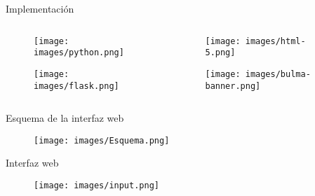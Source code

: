 \documentclass[8pt,xcolor=dvipsnames]{beamer}
\begin{document}
\begin{frame}[fragile]{Implementación}
    \begin{columns}
        \begin{column}{0.45\textwidth}
            \begin{figure}
                \centering
                \texttt{[image: images/python.png]}
            \end{figure}
            \vspace{1.5cm}
            \begin{figure}
                \centering
                \texttt{[image: images/flask.png]}
            \end{figure}
        \end{column}
        \begin{column}{0.45\textwidth}
            \begin{figure}
                \centering
                \texttt{[image: images/html-5.png]}
            \end{figure}
            \vspace{1.5cm}
            \begin{figure}
                \centering
                \texttt{[image: images/bulma-banner.png]}
            \end{figure}
        \end{column}
    \end{columns}
\end{frame}


\begin{frame}[fragile]{Esquema de la interfaz web}
    \begin{figure}
        \centering
        \texttt{[image: images/Esquema.png]}
    \end{figure}
\end{frame}


\begin{frame}[fragile]{Interfaz web}
    \begin{figure}
        \centering
        \texttt{[image: images/input.png]}
    \end{figure}
\end{frame}

\end{document}
